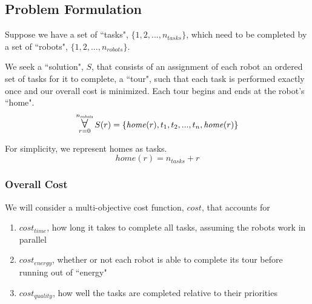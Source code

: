 \documentclass[a4paper]{article}
\newcommand\Forall{\mathop{\mbox{\Large $\mathsurround0pt\forall$}}}
\begin{document}
%
%


\subsection{Problem Formulation}


Suppose we have a set of ``tasks", $\{1, 2, ..., n_\mathit{tasks}\}$, which need to be completed by a set of ``robots", $\{1, 2, ..., n_\mathit{robots}\}$.

We seek a ``solution", $S$, that consists of an assignment of each robot an ordered set of tasks for it to complete, a ``tour", such that each task is performed exactly once and our overall cost is minimized. Each tour begins and ends at the robot's ``home".
$$
\Forall_{r=0}^{n_\mathit{robots}}
S(r) = \{ \mathit{home}(r), t_1, t_2, ..., t_n, \mathit{home}(r) \}
$$

For simplicity, we represent homes as tasks.
$$\mathit{home}(r) = n_\mathit{tasks} + r$$

\subsubsection{Overall Cost}

We will consider a multi-objective cost function, $\mathit{cost}$, that accounts for
\begin{enumerate}
\item $\mathit{cost}_\mathit{time}$, how long it takes to complete all tasks, assuming the robots work in parallel
\item $\mathit{cost}_\mathit{energy}$, whether or not each robot is able to complete its tour before running out of ``energy"
\item $\mathit{cost}_\mathit{quality}$, how well the tasks are completed relative to their priorities
\end{enumerate}
\end{document}
